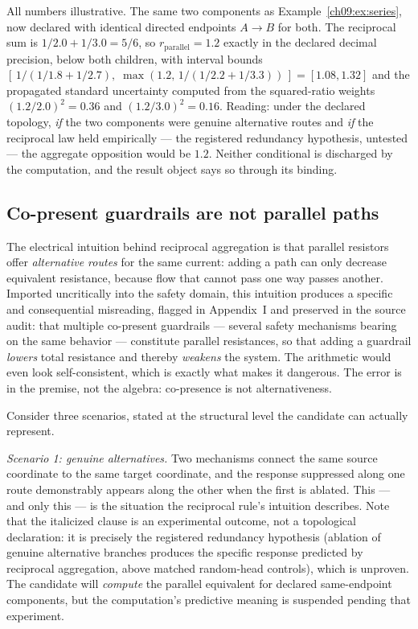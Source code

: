 \begin{example}\label{ch09:ex:parallel}
All numbers illustrative. The same two components as
Example~\ref{ch09:ex:series}, now declared with identical directed
endpoints $A \to B$ for both. The reciprocal sum is
$1/2.0 + 1/3.0 = 5/6$, so $r_{\mathrm{parallel}} = 1.2$ exactly in the
declared decimal precision, below both children, with interval bounds
$[\,1/(1/1.8 + 1/2.7),\; \max(1.2,\, 1/(1/2.2 + 1/3.3))\,] = [1.08, 1.32]$
and the propagated standard uncertainty computed from the squared-ratio
weights $(1.2/2.0)^2 = 0.36$ and $(1.2/3.0)^2 = 0.16$. Reading: under
the declared topology, \emph{if} the two components were genuine
alternative routes and \emph{if} the reciprocal law held empirically ---
the registered redundancy hypothesis, untested --- the aggregate
opposition would be $1.2$. Neither conditional is discharged by the
computation, and the result object says so through its binding.
\end{example}

\subsection{Co-present guardrails are not parallel paths}\label{ch09:sec:guardrails}

The electrical intuition behind reciprocal aggregation is that parallel
resistors offer \emph{alternative routes} for the same current: adding a
path can only decrease equivalent resistance, because flow that cannot
pass one way passes another. Imported uncritically into the safety domain,
this intuition produces a specific and consequential misreading, flagged
in Appendix~I and preserved in the source audit: that multiple co-present
guardrails --- several safety mechanisms bearing on the same behavior ---
constitute parallel resistances, so that adding a guardrail \emph{lowers}
total resistance and thereby \emph{weakens} the system. The arithmetic
would even look self-consistent, which is exactly what makes it dangerous.
The error is in the premise, not the algebra: co-presence is not
alternativeness.

Consider three scenarios, stated at the structural level the candidate can
actually represent.

\emph{Scenario 1: genuine alternatives.} Two mechanisms connect the same
source coordinate to the same target coordinate, and the response
suppressed along one route demonstrably appears along the other when the
first is ablated. This --- and only this --- is the situation the
reciprocal rule's intuition describes. Note that the italicized clause is
an experimental outcome, not a topological declaration: it is precisely
the registered redundancy hypothesis (ablation of genuine alternative
branches produces the specific response predicted by reciprocal
aggregation, above matched random-head controls), which is unproven. The
candidate will \emph{compute} the parallel equivalent for declared
same-endpoint components, but the computation's predictive meaning is
suspended pending that experiment.

